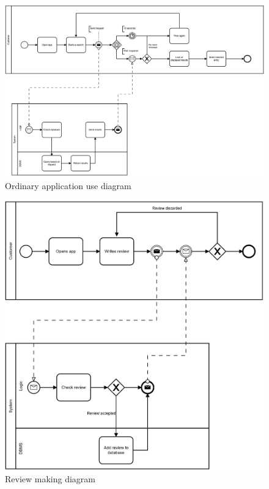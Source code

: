 \begin{figure}[!htb]
\centering
\includegraphics[width=1.0\textwidth]{Img/DiagramNormalUse.jpg}
\caption{Ordinary application use diagram}
\end{figure}

\begin{figure}[!htb]
\centering
\includegraphics[width=1.0\textwidth]{Img/DiagramReview.jpg}
\caption{Review making diagram}
\end{figure}

